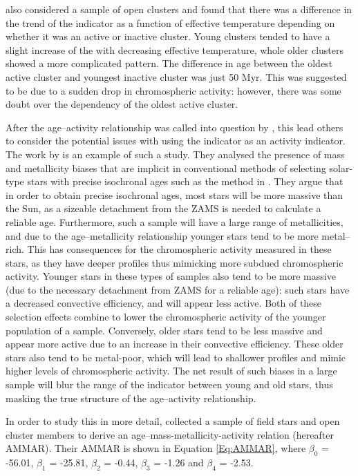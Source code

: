\citet{Pace_2013} also considered a sample of open clusters and found that there was a difference in the trend of the \Rprime indicator as a function of effective temperature depending on whether it was an active or inactive cluster. Young clusters tended to have a slight increase of the \Rprime with decreasing effective temperature, whole older clusters showed a more complicated pattern. The difference in age between the oldest active cluster and youngest inactive cluster was just 50 Myr. This was suggested to be due to a sudden drop in chromospheric activity: however, there was some doubt over the dependency of the oldest active cluster.

After the age--activity relationship was called into question by \citet{Pace_2013}, this lead others to consider the potential issues with using the \Rprime indicator as an activity indicator. The work by \citet{Lorenzo_Oliveira_etal_2016} is an example of such a study. They analysed the presence of mass and metallicity biases that are implicit in conventional methods of selecting solar-type stars with precise isochronal ages such as the method in \citet{Pace_2013}. They argue that in order to obtain precise isochronal ages, most stars will be more massive than the Sun, as a sizeable detachment from the ZAMS is needed to calculate a reliable age. Furthermore, such a sample will have a large range of metallicities, and due to the age--metallicity relationship younger stars tend to be more metal--rich. This has consequences for the chromospheric activity measured in these stars, as they have deeper \caII profiles thus mimicking more subdued chromospheric activity. Younger stars in these types of samples also tend to be more massive (due to the necessary detachment from ZAMS for a reliable age): such stars have a decreased convective efficiency, and will appear less active. Both of these selection effects combine to lower the chromospheric activity of the younger population of a sample. Conversely, older stars tend to be less massive and appear more active due to an increase in their convective efficiency. These older stars also tend to be metal-poor, which will lead to shallower \caII profiles and mimic higher levels of chromospheric activity. The net result of such biases in a large sample will blur the range of the \Rprime indicator between young and old stars, thus masking the true structure of the age--activity relationship.

In order to study this in more detail, \citet{Lorenzo_Oliveira_etal_2016} collected a sample of field stars and open cluster members to derive an age--mass-metallicity-activity relation (hereafter AMMAR). Their AMMAR is shown in Equation \ref{Eq:AMMAR}, where $\beta_{0}$ = -56.01, $\beta_{1}$ = -25.81, $\beta_{2}$ = -0.44, $\beta_{3}$ = -1.26 and $\beta_{4}$ = -2.53.

